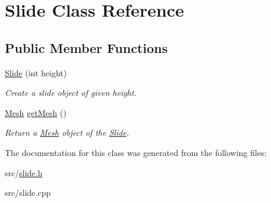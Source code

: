 \hypertarget{classSlide}{}\section{Slide Class Reference}
\label{classSlide}
\subsection*{Public Member Functions}
\begin{DoxyCompactItemize}
\item 
\hyperlink{classSlide_a1a85771186df0a7153926d23c6a844e9}{Slide} (int height)\hypertarget{classSlide_a1a85771186df0a7153926d23c6a844e9}{}\label{classSlide_a1a85771186df0a7153926d23c6a844e9}

\begin{DoxyCompactList}\small\item\em Create a slide object of given height. \end{DoxyCompactList}\item 
\hyperlink{classMesh}{Mesh} \hyperlink{classSlide_a28e5e12e3084435a59a1b7830fc4e65a}{get\+Mesh} ()\hypertarget{classSlide_a28e5e12e3084435a59a1b7830fc4e65a}{}\label{classSlide_a28e5e12e3084435a59a1b7830fc4e65a}

\begin{DoxyCompactList}\small\item\em Return a \hyperlink{classMesh}{Mesh} object of the \hyperlink{classSlide}{Slide}. \end{DoxyCompactList}\end{DoxyCompactItemize}


The documentation for this class was generated from the following files\+:\begin{DoxyCompactItemize}
\item 
src/\hyperlink{slide_8h}{slide.\+h}\item 
src/slide.\+cpp\end{DoxyCompactItemize}
